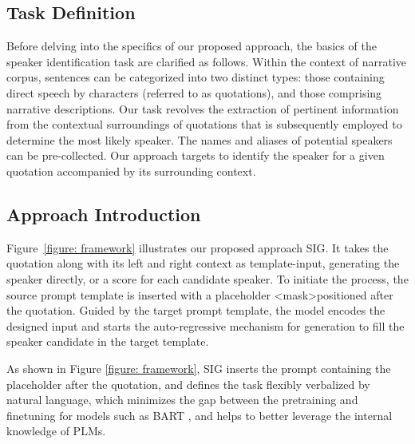 \documentclass[letterpaper]{article} %
\begin{document}
\subsection{Task Definition}

Before delving into the specifics of our proposed approach, the basics of the speaker identification task are clarified as follows. Within the context of narrative corpus, sentences can be categorized into two distinct types: those containing direct speech by characters (referred to as quotations), and those comprising narrative descriptions. Our task revolves the extraction of pertinent information from the contextual surroundings of quotations that is subsequently employed to determine the most likely speaker. The names and aliases of potential speakers can be pre-collected. Our approach targets to identify the speaker for a given quotation accompanied by its surrounding context.





\subsection{Approach Introduction}
\label{ssec:template}

Figure~\ref{figure: framework} illustrates our proposed approach SIG. It takes the quotation along with its left and right context as template-input, generating the speaker directly, or a score for each candidate speaker. To initiate the process, the source prompt template is inserted with a placeholder \textless mask\textgreater \;positioned after the quotation.
Guided by the target prompt template, the model encodes the designed input and starts the auto-regressive mechanism for generation to fill the speaker candidate in the target template.

As shown in Figure \ref{figure: framework}, SIG inserts the prompt containing the placeholder after the quotation, and defines the task flexibly verbalized by natural language, which minimizes the gap between the pretraining and finetuning for models such as BART \cite{lewis-etal-2020-bart}, and helps to better leverage the internal knowledge of PLMs.
\end{document}
